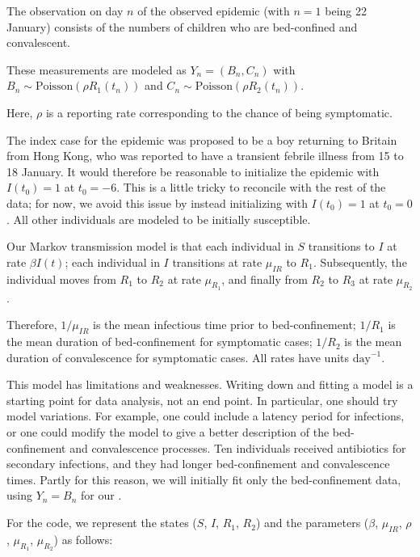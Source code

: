 \documentclass{beamer}\usepackage[]{graphicx}\usepackage[]{color}
\begin{document}
\begin{frame}[fragile]
\item  The observation on day $n$ of the observed epidemic (with $n=1$ being 22 January) consists of the numbers of children who are bed-confined and convalescent. 

\item  These measurements are modeled as $Y_n=(B_n,C_n)$ with $B_n\sim\mathrm{Poisson}(\rho R_1(t_n))$ and $C_n\sim\mathrm{Poisson}(\rho R_2(t_n))$. 

\item  Here, $\rho$ is a reporting rate corresponding to the chance of being symptomatic.

\item  The index case for the epidemic was proposed to be a boy returning to Britain from Hong Kong, who was reported to have a transient febrile illness
from 15 to 18 January. It would therefore be reasonable to initialize the epidemic with $I(t_0)=1$ at $t_0=-6$. This is a little tricky to reconcile with the rest of the data; for now, we avoid this issue by instead initializing with  $I(t_0)=1$ at $t_0=0$. All other individuals are modeled to be initially susceptible.

\item  Our Markov transmission model is that each individual in $S$ transitions to $I$ at rate $\beta I(t)$; each individual in $I$ transitions at rate $\mu_{IR}$ to $R_1$. Subsequently, the individual moves from $R_1$ to $R_2$ at  rate $\mu_{R_1}$, and finally from $R_2$ to $R_3$ at rate $\mu_{R_2}$. 

\item  Therefore, $1/\mu_{IR}$ is the mean infectious time prior to bed-confinement; $1/R_1$ is the mean duration of bed-confinement for symptomatic cases;  $1/R_2$ is the mean duration of convalescence for symptomatic cases. All rates have units $\mathrm{day}^{-1}$. 

\item  This model has limitations and weaknesses. Writing down and fitting a model is a starting point for data analysis, not an end point. In particular, one should try model variations. For example, one could include a latency period for infections, or one could modify the model to give a better description of the bed-confinement and convalescence processes. Ten individuals received antibiotics for secondary infections, and they had longer bed-confinement and convalescence times. Partly for this reason, we will initially fit only the bed-confinement data, using $Y_n=B_n$ for our . 

\item  For the code, we represent the states ($S$, $I$, $R_1$, $R_2$) and the parameters ($\beta$, $\mu_{IR}$, $\rho$, $\mu_{R_1}$, $\mu_{R_2}$) as follows:
\ei

\end{frame}
\end{document}
